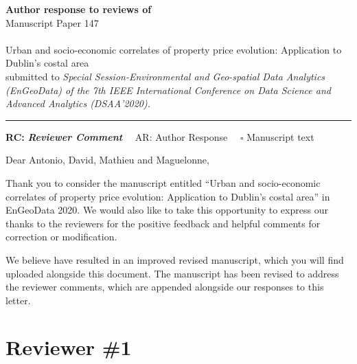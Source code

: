 \documentclass[]{article}
\begin{document}
{\Large\bf Author response to reviews of}\\[1em]
Manuscript Paper 147\\ \\
{\Large Urban and socio-economic correlates of property price evolution: Application to Dublin's costal area}\\[1em]

{submitted to \it Special Session-Environmental and Geo-spatial Data Analytics (EnGeoData) of the 7th IEEE International Conference on Data Science and Advanced Analytics (DSAA'2020). }\\
\hrule

\hfill {\bfseries RC:} \textbf{\textit{Reviewer Comment}}\(\quad\) AR: Author Response \(\quad\square\) Manuscript text

\vspace{2em}

Dear Antonio, David, Mathieu and Maguelonne,

Thank you to consider the manuscript entitled ``Urban and socio-economic correlates of property price evolution: Application to Dublin's costal area'' in EnGeoData 2020. We would also like to take this opportunity to express our thanks to the reviewers for the positive feedback and helpful comments for correction or modification.

We believe have resulted in an improved revised manuscript, which you will find uploaded alongside this document. The manuscript has been revised to address the reviewer comments, which are appended alongside our responses to this letter.

\hypertarget{reviewer-1}{%
\section{Reviewer \#1}\label{reviewer-1}}



\end{document}
